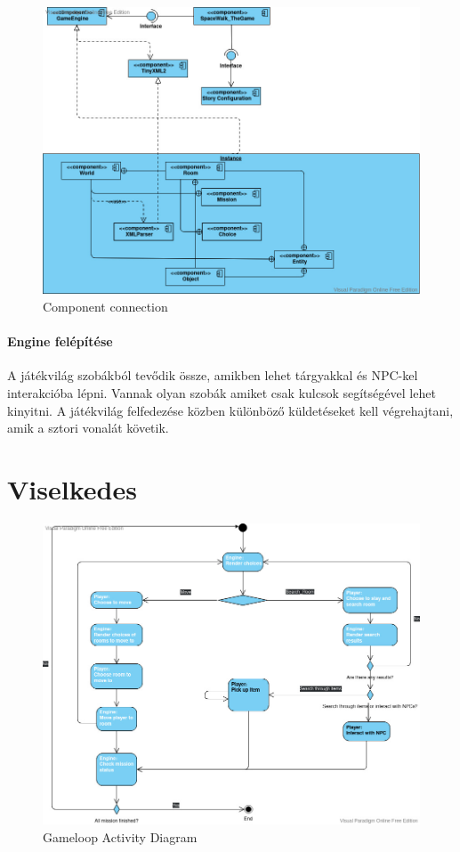 \documentclass{scrarticle}
\begin{document}
\begin{figure}[H]
    \includegraphics[width=0.75\columnwidth]{Component_Connection.jpg}
    \caption{Component connection}\label{fig:3}
\end{figure}

\paragraph{Engine felépítése}
A játékvilág szobákból tevődik össze, amikben lehet tárgyakkal és NPC-kel interakcióba lépni. Vannak olyan szobák amiket csak kulcsok segítségével lehet kinyitni. A játékvilág felfedezése közben különböző küldetéseket kell végrehajtani, amik a sztori vonalát követik.

\section{Viselkedes}
\begin{figure}[H]
    \includegraphics[width=1.0\columnwidth]{GameLoop_ActivityDiagram.jpg}
    \caption{Gameloop Activity Diagram}\label{fig:4}
\end{figure}
\end{document}
